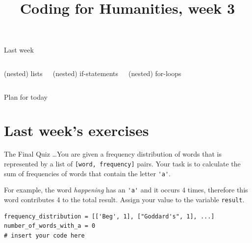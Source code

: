 \documentclass[aspectratio=169,usenames,dvipsnames]{beamer}
\title{Coding for Humanities, week 3}
\begin{document}
\begin{frame}
 \titlepage
\end{frame}

\begin{frame}{Last week}
\begin{columns}[T]
    \Large
    (nested) lists

    \vspace{1em}
    (nested) if-statements 

    \vspace{1em}
    (nested) for-loops
\end{columns}
\end{frame}

\begin{frame}{Plan for today}
 \tableofcontents
\end{frame}

\section{Last week's exercises}
\begin{frame}[fragile]{The Final Quiz}
\dots You are given a frequency distribution of words that is represented by a
list of \lstinline{[word, frequency]} pairs. Your task is to calculate the sum
of frequencies of words that contain the letter \lstinline{'a'}.
    
For example, the word \emph{happening} has an \lstinline{'a'} and it occurs
4 times, therefore this word contributes 4 to the total result. Assign your
value to the variable \lstinline{result}.

\begin{lstlisting}
frequency_distribution = [['Beg', 1], ["Goddard's", 1], ...]
number_of_words_with_a = 0
# insert your code here
\end{lstlisting}
\end{frame}
\end{document}
